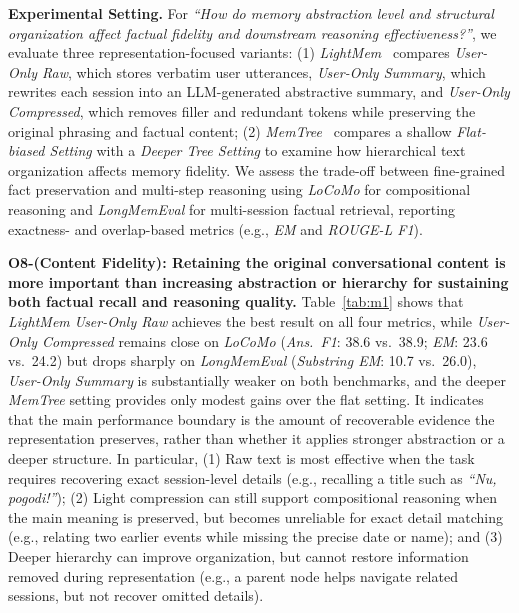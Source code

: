 \documentclass{llmxive}
\providecommand{\hsk}[1]{#1}
\begin{document}
\noindent \textbf{Experimental Setting.}
For \textit{``How do memory abstraction level and structural organization affect factual fidelity and downstream reasoning effectiveness?''}, we evaluate three representation-focused variants:
(1) \textit{LightMem}~\cite{LightMem} compares \textit{User-Only Raw}, which stores verbatim user utterances, \textit{User-Only Summary}, which rewrites each session into an LLM-generated abstractive summary, and \textit{User-Only Compressed}, which removes filler and redundant tokens while preserving the original phrasing and factual content;
(2) \textit{MemTree}~\cite{MemTree} compares a shallow \textit{Flat-biased Setting} with a \textit{Deeper Tree Setting} to examine how hierarchical text organization affects memory fidelity.
We assess the trade-off between fine-grained fact preservation and multi-step reasoning using \textit{LoCoMo} for compositional reasoning and \textit{LongMemEval} for multi-session factual retrieval, reporting exactness- and overlap-based metrics (e.g., \textit{EM} and \textit{ROUGE-L F1}).

\noindent \textbf{O8-(Content Fidelity): Retaining the original conversational content is more important than increasing abstraction or hierarchy for sustaining both factual recall and reasoning quality.}
Table~\ref{tab:m1} shows that \textit{LightMem} \textit{User-Only Raw} achieves the best result on all four metrics, while \textit{User-Only Compressed} remains close on \textit{LoCoMo} (\textit{Ans.\ F1}: 38.6 vs.\ 38.9; \textit{EM}: 23.6 vs.\ 24.2) but drops sharply on \textit{LongMemEval} (\textit{Substring EM}: 10.7 vs.\ 26.0), \textit{User-Only Summary} is substantially weaker on both benchmarks, and the deeper \textit{MemTree} setting provides only modest gains over the flat setting.
It indicates that the main performance boundary is the amount of recoverable evidence the representation preserves, rather than whether it applies stronger abstraction or a deeper structure.
In particular, (1) Raw text is most effective when the task requires recovering exact session-level details (e.g., recalling a title such as \textit{``Nu, pogodi!''}); (2) Light compression can still support compositional reasoning when the main meaning is preserved, but becomes unreliable for exact detail matching (e.g., relating two earlier events while missing the precise date or name); and (3) Deeper hierarchy can improve organization, but cannot restore information removed during representation (e.g., a parent node helps navigate related sessions, but not recover omitted details).
\end{document}

